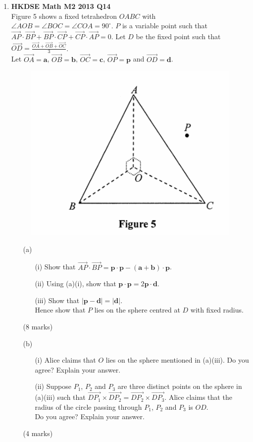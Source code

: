\documentclass{report}
\begin{document}
\begin{enumerate}
	\item \textbf{HKDSE Math M2 2013 Q14}\\
	Figure 5 shows a fixed tetrahedron $OABC$ with $\angle AOB = \angle BOC = \angle COA = 90^{\circ}$. $P$ is a variable point such that $\overrightarrow{AP}\cdot\overrightarrow{BP} + \overrightarrow{BP}\cdot\overrightarrow{CP} + \overrightarrow{CP}\cdot\overrightarrow{AP} = 0$. Let $D$ be the fixed point such that $\overrightarrow{OD} = \displaystyle\frac{\overrightarrow{OA}+\overrightarrow{OB}+\overrightarrow{OC}}{3}$. \\
	Let $\overrightarrow{OA} = \textbf{a}$, $\overrightarrow{OB} = \textbf{b}$, $\overrightarrow{OC} = \textbf{c}$, $\overrightarrow{OP} = \textbf{p}$ and $\overrightarrow{OD} = \textbf{d}$. 
	\begin{figure}[H]
		\centering
		\includegraphics[width = .4\linewidth]{2013Figure5}
	\end{figure}
	\begin{enumerate}
		\item [(a)]
		\begin{enumerate}
			\item [(i)]Show that $\overrightarrow{AP}\cdot\overrightarrow{BP} = \textbf{p}\cdot\textbf{p} - (\textbf{a} + \textbf{b})\cdot\textbf{p}$. 
			\item [(ii)]Using (a)(i), show that $\textbf{p}\cdot\textbf{p} = 2\textbf{p}\cdot\textbf{d}$. 
			\item [(iii)]Show that $|\textbf{p} - \textbf{d}| = |\textbf{d}|$. \\
			Hence show that $P$ lies on the sphere centred at $D$ with fixed radius.
		\end{enumerate}
		(8 marks)
		\item [(b)]
		\begin{enumerate}
			\item [(i)]Alice claims that $O$ lies on the sphere mentioned in (a)(iii). Do you agree? Explain your answer. 
			\item [(ii)]Suppose $P_1$, $P_2$ and $P_3$ are three distinct points on the sphere in (a)(iii) such that $\overrightarrow{DP_1}\times\overrightarrow{DP_2} = \overrightarrow{DP_2}\times\overrightarrow{DP_3}$. Alice claims that the radius of the circle passing through $P_1$, $P_2$ and $P_3$ is $OD$. \\
			Do you agree? Explain your answer.
		\end{enumerate}
		(4 marks)
	\end{enumerate}

\end{enumerate}
\end{document}
